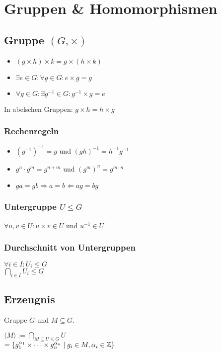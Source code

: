 \section*{Gruppen \& Homomorphismen}

\subsection*{Gruppe $(G,\times)$}
\begin{itemize}
	\item $(g \times h) \times k = g \times (h \times k)$
	\item $\exists e \in G: \forall g\in G: e\times g = g$
	\item $\forall g\in G: \exists g^{-1}\in G: g^{-1} \times g = e$
\end{itemize}
In abelschen Gruppen: $g\times h = h \times g$

\subsubsection*{Rechenregeln}
\begin{itemize}
	\item $(g^{-1})^{-1}=g$ und $(gh)^{-1}=h^{-1}g^{-1}$
	\item $g^n \cdot g^m = g^{n+m}$ und $(g^m)^n = g^{m\cdot n}$
	\item $ga=gb\Rightarrow a=b \Leftarrow ag=bg$
\end{itemize}

\subsubsection*{Untergruppe $U\le G$}
$\forall u,v\in U: u\times v \in U$ und $u^{-1}\in U$

\subsubsection*{Durchschnitt von Untergruppen}
$\forall i\in I: U_i \le G$ \\
$\displaystyle \bigcap_{i\in I}U_i \le G$

\subsection*{Erzeugnis}
Gruppe $G$ und $M \subseteq G$.

$\displaystyle \langle M \rangle := \bigcap_{M\subseteq U \le G}U$ \\
$= \{g_1^{\alpha_1}\times\cdots\times g_n^{\alpha_n} \mid g_i\in M,\alpha_i\in\mathbb{Z}\} $

